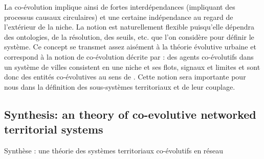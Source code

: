 { La co-évolution implique ainsi de fortes interdépendances (impliquant des processus causaux circulaires) et une certaine indépendance au regard de l'extérieur de la niche. La notion est naturellement flexible puisqu'elle dépendra des ontologies, de la résolution, des seuils, etc. que l'on considère pour définir le système. Ce concept se transmet assez aisément
  à la théorie évolutive urbaine et correspond à la notion de co-évolution décrite par  : des agents co-évolutifs dans un système de villes consistent en une niche et ses flots, signaux et limites et sont donc des entités co-évolutives au sens de . Cette notion sera importante pour nous dans la définition des sous-systèmes territoriaux et de leur couplage.
}








\subsection{Synthesis: an theory of co-evolutive networked territorial systems}{Synthèse : une théorie des systèmes territoriaux co-évolutifs en réseau}




\medskip


